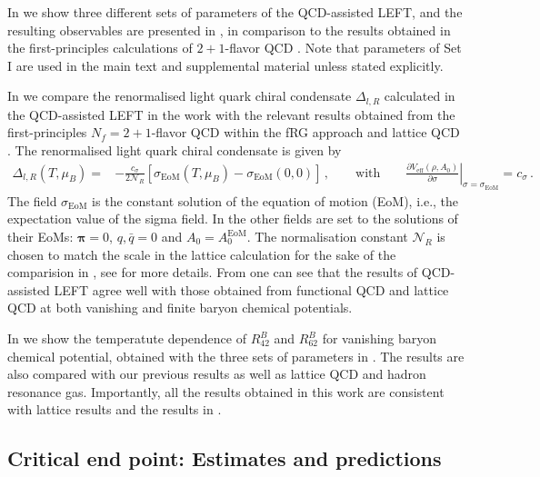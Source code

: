 \documentclass[reprint,twocolumn,superscriptaddress,preprintnumbers,amsmath,amssymb,aps,prd,floatfix]{revtex4-2}
\begin{document}
In  we show three different sets of parameters of the QCD-assisted LEFT, and the resulting observables are presented in , in comparison to the results obtained in the first-principles calculations of $2+1$-flavor QCD \cite{Fu:2019hdw}. Note that parameters of Set I are used in the main text and supplemental material unless stated explicitly.

In  we compare the renormalised light quark chiral condensate $\Delta_{l,R}$ calculated in the QCD-assisted LEFT in the work with the relevant results obtained from the first-principles $N_f=2+1$-flavor QCD within the fRG approach \cite{Fu:2019hdw} and lattice QCD \cite{Borsanyi:2010bp}. The renormalised light quark chiral condensate is given by
%
\begin{align}
    \Delta_{l,R}(T,\mu_B) =& -\frac{c_\sigma}{2\mathcal{N}_R}\left[ \sigma_\mathrm{EoM}(T,\mu_B) -\sigma_\mathrm{EoM}(0,0)\right] \,,\qquad\textrm{with} \qquad \left. \frac{\partial V_{\textrm{eff}}(\rho,A_0)}{\partial \sigma}\right|_{\sigma=\sigma_\mathrm{EoM}}=c_\sigma\,. \label{eq:DeltalR}
\end{align}
%
The field $\sigma_\mathrm{EoM}$ is the constant solution of the equation of motion (EoM), i.e., the expectation value of the sigma field. In  the other fields are set to the solutions of their EoMs: $\boldsymbol{\pi}=0$, $q,\bar q=0$ and $A_0=A_0^\textrm{EoM}$. The normalisation constant $\mathcal{N}_R$ is chosen to match the scale in the lattice calculation for the sake of the comparision in , see \cite{Fu:2019hdw, Braun:2020ada} for more details. From  one can see that the results of QCD-assisted LEFT agree well with those obtained from functional QCD and lattice QCD at both vanishing and finite baryon chemical potentials.

In  we show the temperatute dependence of $R^{B}_{42}$ and $R^{B}_{62}$ for vanishing baryon chemical potential, obtained with the three sets of parameters in . The results are also compared with our previous results as well as lattice QCD and hadron resonance gas. Importantly, all the results obtained in this work are consistent with lattice results and the results in \cite{Fu:2021oaw}. 


\subsection{Critical end point: Estimates and predictions}
\label{app:CEP-Estimates}
\end{document}
